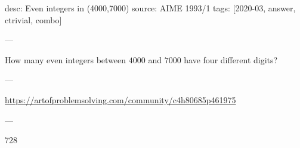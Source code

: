 desc: Even integers in (4000,7000)
source: AIME 1993/1
tags: [2020-03, answer, ctrivial, combo]

---

How many even integers between $4000$ and $7000$ have four different digits?

---

\url{https://artofproblemsolving.com/community/c4h80685p461975}

---

728
